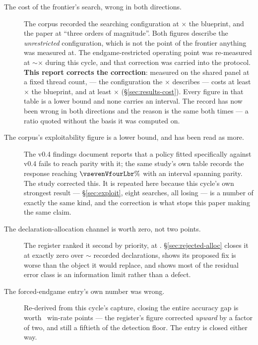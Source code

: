 \begin{description}

\item[The cost of the frontier's search, wrong in both directions.] The corpus recorded the searching configuration at \vsevenCorpusCost$\times$ the
  blueprint, and the \vsix{} paper at ``three orders of magnitude''. Both figures describe the
  \emph{unrestricted} configuration, which is not the point of the frontier anything was measured at.
  The endgame-restricted operating point was re-measured at $\sim$\vsevenCostRecorded$\times$ during
  this cycle, and that correction was carried into the protocol. \textbf{This report corrects the correction}: measured on the shared panel at a fixed thread count,
  \fcheap{} --- the configuration the \vsevenCostRecorded$\times$ describes --- costs at least
  \vsevenCostFcheapTight$\times$ the blueprint, and \frozen{} at least
  \vsevenCostFrozenTight$\times$ (\S\ref{sec:results-cost}). Every figure in that table is a lower
  bound and none carries an interval. The record has now been wrong in both directions and the reason is the
  same both times --- a ratio quoted without the basis it was computed on.

\item[The corpus's exploitability figure is a lower bound, and has been read as more.] The v0.4 findings document reports that a policy fitted
  specifically against v0.4 fails to reach parity with it; the same study's own table records the
  response reaching $\vsevenVfourLbr\%$ with an interval spanning parity. The \vsix{} study corrected this. It is
  repeated here because this cycle's own strongest result --- \S\ref{sec:exploit}, eight searches, all
  losing --- is a number of exactly the same kind, and the correction is what stops this paper making
  the same claim.

\item[The declaration-allocation channel is worth zero, not two points.] The
  register ranked it second by priority, at \vsevenLonePriority{}. \S\ref{sec:rejected-alloc} closes it
  at exactly zero over $\sim$\vsevenLoneDecls{} recorded declarations, shows its proposed fix is worse
  than the object it would replace, and shows most of the residual error class is an information limit
  rather than a defect.

\item[The forced-endgame entry's own number was wrong.]
  Re-derived from this cycle's capture, closing the entire accuracy gap is worth
  \vsevenLthirteenClose{}~win-rate points --- the register's figure corrected \emph{upward} by a factor
  of two, and still a fiftieth of the detection floor. The entry is closed either way.


\end{description}
